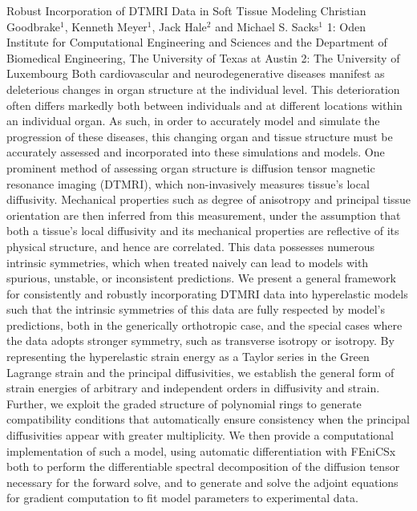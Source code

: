 \begin{addmargin}[2em]{0em}
\vspace{1.5ex}
\abs
{Robust Incorporation of DTMRI Data in Soft Tissue Modeling}
{Christian Goodbrake$^{1}$, Kenneth Meyer$^{1}$, Jack Hale$^{2}$ and Michael S. Sacks$^{1}$}
{1: Oden Institute for Computational Engineering and Sciences and the Department of Biomedical Engineering, The University of Texas at Austin 2: The University of Luxembourg}
{Both cardiovascular and neurodegenerative diseases manifest as deleterious changes in organ structure at the individual level. This deterioration often differs markedly both between individuals and at different locations within an individual organ. As such, in order to accurately model and simulate the progression of these diseases, this changing organ and tissue structure must be accurately assessed and incorporated into these simulations and models. One prominent method of assessing organ structure is diffusion tensor magnetic resonance imaging (DTMRI), which non-invasively measures tissue’s local diffusivity. Mechanical properties such as degree of anisotropy and principal tissue orientation are then inferred from this measurement, under the assumption that both a tissue’s local diffusivity and its mechanical properties are reflective of its physical structure, and hence are correlated. This data possesses numerous intrinsic symmetries, which when treated naively can lead to models with spurious, unstable, or inconsistent predictions. We present a general framework for consistently and robustly incorporating DTMRI data into hyperelastic models such that the intrinsic symmetries of this data are fully respected by model’s predictions, both in the generically orthotropic case, and the special cases where the data adopts stronger symmetry, such as transverse isotropy or isotropy. By representing the hyperelastic strain energy as a Taylor series in the Green Lagrange strain and the principal diffusivities, we establish the general form of strain energies of arbitrary and independent orders in diffusivity and strain. Further, we exploit the graded structure of polynomial rings to generate compatibility conditions that automatically ensure consistency when the principal diffusivities appear with greater multiplicity. We then provide a computational implementation of such a model, using automatic differentiation with FEniCSx both to perform the differentiable spectral decomposition of the diffusion tensor necessary for the forward solve, and to generate and solve the adjoint equations for gradient computation to fit model parameters to experimental data.}



\end{addmargin}
